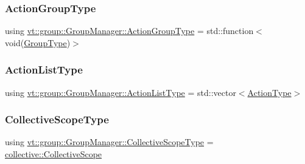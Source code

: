 \mbox{\label{structvt_1_1group_1_1_group_manager_ae871c5871ad62b530220009c1ee4d4b9}} 
\subsubsection{\texorpdfstring{Action\+Group\+Type}{ActionGroupType}}
{\footnotesize\ttfamily using \hyperlink{structvt_1_1group_1_1_group_manager_ae871c5871ad62b530220009c1ee4d4b9}{vt\+::group\+::\+Group\+Manager\+::\+Action\+Group\+Type} =  std\+::function$<$void(\hyperlink{namespacevt_a27b5e4411c9b6140c49100e050e2f743}{Group\+Type})$>$}

\mbox{\label{structvt_1_1group_1_1_group_manager_a48b2dd05bbdda19c5d6195b8932a2716}} 
\subsubsection{\texorpdfstring{Action\+List\+Type}{ActionListType}}
{\footnotesize\ttfamily using \hyperlink{structvt_1_1group_1_1_group_manager_a48b2dd05bbdda19c5d6195b8932a2716}{vt\+::group\+::\+Group\+Manager\+::\+Action\+List\+Type} =  std\+::vector$<$\hyperlink{namespacevt_ae0a5a7b18cc99d7b732cb4d44f46b0f3}{Action\+Type}$>$}

\mbox{\label{structvt_1_1group_1_1_group_manager_a376be92b957fb33ac9b855f6d134ca6a}} 
\subsubsection{\texorpdfstring{Collective\+Scope\+Type}{CollectiveScopeType}}
{\footnotesize\ttfamily using \hyperlink{structvt_1_1group_1_1_group_manager_a376be92b957fb33ac9b855f6d134ca6a}{vt\+::group\+::\+Group\+Manager\+::\+Collective\+Scope\+Type} =  \hyperlink{structvt_1_1collective_1_1_collective_scope}{collective\+::\+Collective\+Scope}}

